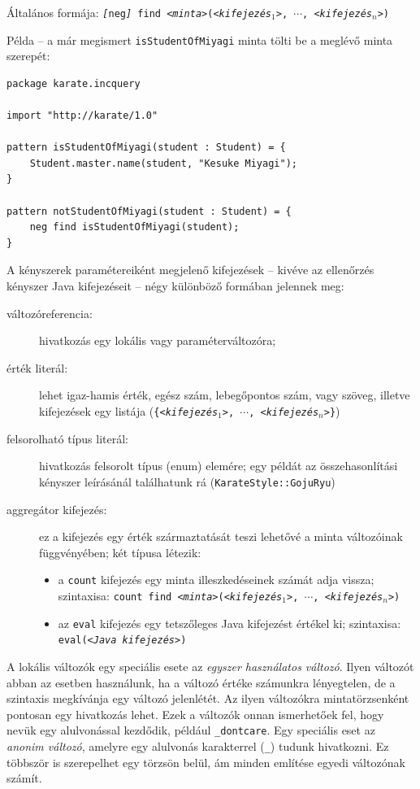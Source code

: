 \noindent Általános formája: \texttt{\textit{[}neg\textit{]} find \textit{<minta>}(\textit{<kifejezés$_1$>}, $\cdots$, \textit{<kifejezés$_n$>})}

\noindent Példa -- a már megismert \texttt{isStudentOfMiyagi} minta tölti be a meglévő minta szerepét:
\begin{lstlisting}
package karate.incquery

import "http://karate/1.0"

pattern isStudentOfMiyagi(student : Student) = {
    Student.master.name(student, "Kesuke Miyagi");
}

pattern notStudentOfMiyagi(student : Student) = {
    neg find isStudentOfMiyagi(student);
}
\end{lstlisting}

\vspace{\baselineskip}\noindent %
A kényszerek paramétereiként megjelenő kifejezések -- kivéve az ellenőrzés kényszer Java kifejezéseit -- négy különböző formában jelennek meg:
\begin{description}
    \item[változóreferencia:] hivatkozás egy lokális vagy paraméterváltozóra; 
    \item[érték literál:] lehet igaz-hamis érték, egész szám, lebegőpontos szám, vagy szöveg, illetve kifejezések egy listája (\texttt{\{\textit{<kifejezés$_1$>}, $\cdots$, \textit{<kifejezés$_n$>}\}})
    \item[felsorolható típus literál:] hivatkozás felsorolt típus (enum) elemére; egy példát az összehasonlítási kényszer leírásánál találhatunk rá (\texttt{KarateStyle::GojuRyu})
    \item[aggregátor kifejezés:] ez a kifejezés egy érték származtatását teszi lehetővé a minta változóinak függvényében; két típusa létezik:
    \begin{itemize}
        \item a \texttt{count} kifejezés egy minta illeszkedéseinek számát adja vissza; szintaxisa: \mbox{\texttt{count find \textit{<minta>}(\textit{<kifejezés$_1$>}, $\cdots$, \textit{<kifejezés$_n$>})}}
        \item \begin{sloppypar}az \texttt{eval} kifejezés egy tetszőleges Java kifejezést értékel ki; szintaxisa: \mbox{\texttt{eval(\textit{<Java kifejezés>})}}\end{sloppypar}
    \end{itemize}
\end{description}

A lokális változók egy speciális esete az \emph{egyszer használatos változó}.
Ilyen változót abban az esetben használunk, ha a változó értéke számunkra lényegtelen, de a szintaxis megkívánja egy változó jelenlétét.
Az ilyen változókra mintatörzsenként pontosan egy hivatkozás lehet.
Ezek a változók onnan ismerhetőek fel, hogy nevük egy alulvonással kezdődik, például \texttt{\_dontcare}.
Egy speciális eset az \emph{anonim változó}, amelyre egy alulvonás karakterrel (\texttt{\_}) tudunk hivatkozni.
Ez többször is szerepelhet egy törzsön belül, ám minden említése egyedi változónak számít.
